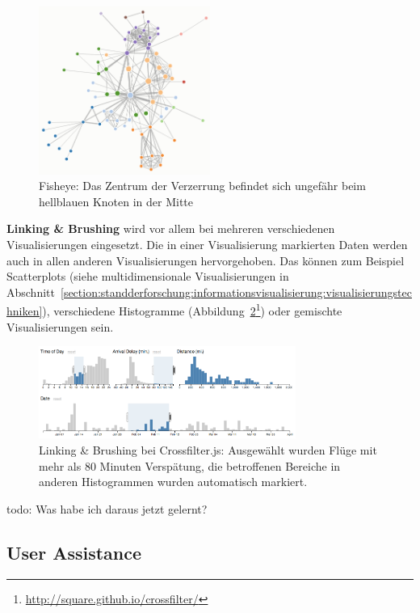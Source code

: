 \documentclass[
	headsepline,
	footsepline,
	fontsize=12pt,
	bibliography=totoc
]{scrbook}
\begin{document}
\begin{figure}[htbp]
   \centering
   \includegraphics[width=0.5\textwidth]{images/grundlagen-fisheye.png}
   \caption{Fisheye: Das Zentrum der Verzerrung befindet sich ungefähr beim hellblauen Knoten in der Mitte}
   \label{figure:fisheye}
\end{figure}


\textbf{Linking \& Brushing} wird vor allem bei mehreren verschiedenen Visualisierungen eingesetzt. Die in einer Visualisierung markierten Daten werden auch in allen anderen Visualisierungen hervorgehoben. Das können zum Beispiel Scatterplots (siehe multidimensionale Visualisierungen in Abschnitt~\ref{section:standderforschung:informationsvisualisierung:visualisierungstechniken}), verschiedene Histogramme (Abbildung~\ref{figure:link_brush}\footnote{\url{http://square.github.io/crossfilter/}}) oder gemischte Visualisierungen sein.

\begin{figure}[htbp]
   \centering
   \includegraphics[width=0.75\textwidth]{images/grundlagen-link_brush.png}
   \caption{Linking \& Brushing bei Crossfilter.js: Ausgewählt wurden Flüge mit mehr als 80 Minuten Verspätung, die betroffenen Bereiche in anderen Histogrammen wurden automatisch markiert.}
   \label{figure:link_brush}
\end{figure}

todo: Was habe ich daraus jetzt gelernt?

\subsection{User Assistance}
\label{section:standderforschung:grundlagen:user_assistance}
\end{document}

